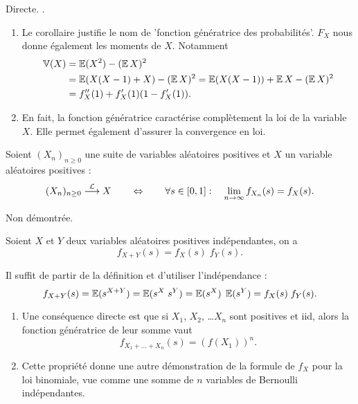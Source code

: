 \proof 
Directe.
\eproof.

\remarks
\begin{enumerate}
  \item Le corollaire justifie le nom de 'fonction génératrice des probabilités'. $F_X$ nous donne également les moments de $X$. Notamment
  \begin{align*}
    \operatorname{\mathbb{V}}(X) 
    & = \operatorname{\mathbb{E}}(X^2) - (\operatorname{\mathbb{E}} X)^2 \\
    & = \operatorname{\mathbb{E}}(X(X-1) + X) - (\operatorname{\mathbb{E}} X)^2
    = \operatorname{\mathbb{E}}(X(X-1)) + \operatorname{\mathbb{E}} X - (\operatorname{\mathbb{E}} X)^2 \\
    & = f''_X(1) + f'_X(1)(1 - f'_X(1)). 
  \end{align*}
  \item En fait, la fonction génératrice caractérise complètement la loi de la variable $X$. Elle permet également d'assurer la convergence en loi.
\end{enumerate}

\begin{proposition}
  Soient $(X_n)_{n \geq 0}$ une suite de variables aléatoires positives et $X$ un variable aléatoires positives :
  $$
  (X_n)_{n \geq 0} \overset{\mathcal{L}}{\longrightarrow} X
  \qquad \Leftrightarrow \qquad
  \forall s \in [0, 1]: \quad \lim_{n \to \infty} f_{X_n}(s) = f_X(s).
  $$
\end{proposition}

\proof Non démontrée. \eproof

\begin{proposition}
  Soient $X$ et $Y$ deux variables aléatoires positives indépendantes, on a
  $$
  f_{X+Y}(s) = f_X(s) \; f_Y(s).
  $$
\end{proposition}

\proof
Il suffit de partir de la définition et d'utiliser l'indépendance :
$$
f_{X+Y}(s) 
= \operatorname{\mathbb{E}}(s^{X+Y}) = \operatorname{\mathbb{E}}(s^X \; s^Y) = \operatorname{\mathbb{E}}(s^X) \;  \operatorname{\mathbb{E}}(s^Y)
= f_X(s) \; f_Y(s).
$$
\eproof

\remarks
\begin{enumerate}
  \item Une conséquence directe est que si $X_1$, $X_2$, \dots $X_n$ sont positives et iid, alors la fonction génératrice de leur somme vaut
  $$
  f_{X_1 + \dots + X_n}(s) = \left(f(X_1)\right)^n.
  $$
  \item Cette propriété donne une autre démonstration de la formule de $f_X$ pour la loi binomiale, vue comme une somme de $n$ variables de Bernoulli indépendantes.
\end{enumerate}

